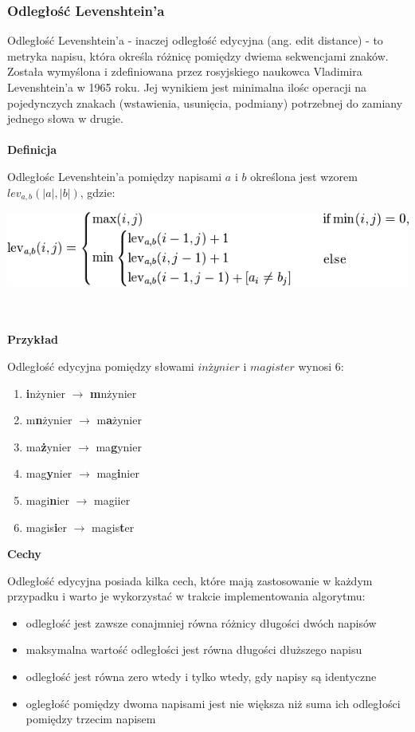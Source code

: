 \documentclass[a4paper,12pt]{article}
\begin{document}
\newpage

\subsubsection{Odległość Levenshtein'a}

Odległość Levenshtein'a - inaczej odległość edycyjna (ang. edit distance) - to metryka napisu, która określa różnicę pomiędzy dwiema sekwencjami znaków. Została wymyślona i zdefiniowana przez rosyjskiego naukowca Vladimira Levenshtein'a w 1965 roku.
Jej wynikiem jest minimalna ilośc operacji na pojedynczych znakach (wstawienia, usunięcia, podmiany) potrzebnej do zamiany jednego słowa w drugie.
\\ \\
\textbf{Definicja}

Odległośc Levenshtein'a pomiędzy napisami $a$ i $b$ określona jest wzorem $lev_{a,b}(|a|,|b|)$, gdzie:
\begin{center}
\includegraphics[scale=0.7]{gfx/levenshtein_def.png}
\end{center}
\\ \\
\textbf{Przykład}

Odległość edycyjna pomiędzy słowami $inżynier$ i $magister$ wynosi 6:
\begin{enumerate}
\item \textbf{i}nżynier $\rightarrow$ \textbf{m}nżynier
\item m\textbf{n}żynier $\rightarrow$ m\textbf{a}żynier
\item ma\textbf{ż}ynier $\rightarrow$ ma\textbf{g}ynier
\item mag\textbf{y}nier $\rightarrow$ mag\textbf{i}nier
\item magi\textbf{n}ier $\rightarrow$ magiier
\item magis\textbf{i}er $\rightarrow$ magis\textbf{t}er
\end{enumerate}

\pagebreak

\textbf{Cechy}

Odległość edycyjna posiada kilka cech, które mają zastosowanie w każdym przypadku i warto je wykorzystać w trakcie implementowania algorytmu:
\begin{itemize}
\item odległość jest zawsze conajmniej równa różnicy długości dwóch napisów
\item maksymalna wartość odległości jest równa długości dłuższego napisu
\item odległość jest równa zero wtedy i tylko wtedy, gdy napisy są identyczne
\item ogległość pomiędzy dwoma napisami jest nie większa niż suma ich odległości pomiędzy trzecim napisem
\end{itemize}
\end{document}
